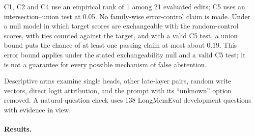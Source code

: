 C1, C2 and C4 use an empirical rank of 1 among 21 evaluated edits; C5 uses an intersection--union test at
0.05. No family-wise error-control claim is made. Under a null model in which target scores are exchangeable
with the random-control scores, with ties counted against the target, and with a valid C5 test, a union bound
puts the chance of at least one passing claim at most about 0.19. This error bound applies under the stated
exchangeability null and a valid C5 test; it is not a guarantee for every possible mechanism of false abstention.

Descriptive arms examine single heads, other late-layer pairs, random write vectors, direct logit attribution,
and the prompt with its ``unknown'' option removed. A natural-question check uses 138 LongMemEval development
questions with evidence in view.

\paragraph{Results.} 
